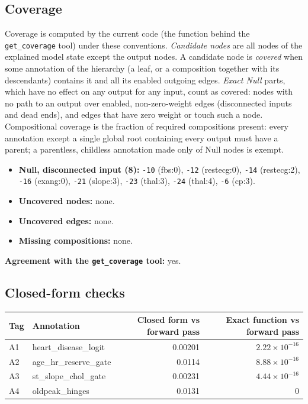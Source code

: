 \begin{drafted}
\subsection{Coverage}\label{app:heart-s2-c1:coverage}
Coverage is computed by the current code (the function behind the \texttt{get\_coverage} tool) under these conventions. \emph{Candidate nodes} are all nodes of the explained model state except the output nodes. A candidate node is \emph{covered} when some annotation of the hierarchy (a leaf, or a composition together with its descendants) contains it and all its enabled outgoing edges. \emph{Exact Null} parts, which have no effect on any output for any input, count as covered: nodes with no path to an output over enabled, non-zero-weight edges (disconnected inputs and dead ends), and edges that have zero weight or touch such a node. Compositional coverage is the fraction of required compositions present: every annotation except a single global root containing every output must have a parent; a parentless, childless annotation made only of Null nodes is exempt.

\begin{itemize}
\item \textbf{Null, disconnected input (8):} \texttt{-10} (fbs:0), \texttt{-12} (restecg:0), \texttt{-14} (restecg:2), \texttt{-16} (exang:0), \texttt{-21} (slope:3), \texttt{-23} (thal:3), \texttt{-24} (thal:4), \texttt{-6} (cp:3).
\item \textbf{Uncovered nodes:} none.
\item \textbf{Uncovered edges:} none.
\item \textbf{Missing compositions:} none.
\end{itemize}
\noindent\textbf{Agreement with the \texttt{get\_coverage} tool:} yes.

\subsection{Closed-form checks}\label{app:heart-s2-c1:closedform}
{\small\noindent\begin{tabularx}{\linewidth}{@{}lXrr@{}}
\toprule Tag & Annotation & Closed form vs forward pass & Exact function vs forward pass \\ \midrule
A1 & heart\_\allowbreak{}disease\_\allowbreak{}logit & 0.00201 & $2.22\times 10^{-16}$ \\
A2 & age\_\allowbreak{}hr\_\allowbreak{}reserve\_\allowbreak{}gate & 0.0114 & $8.88\times 10^{-16}$ \\
A3 & st\_\allowbreak{}slope\_\allowbreak{}chol\_\allowbreak{}gate & 0.00231 & $4.44\times 10^{-16}$ \\
A4 & oldpeak\_\allowbreak{}hinges & 0.0131 & 0 \\
\bottomrule
\end{tabularx}\par}

\end{drafted}
